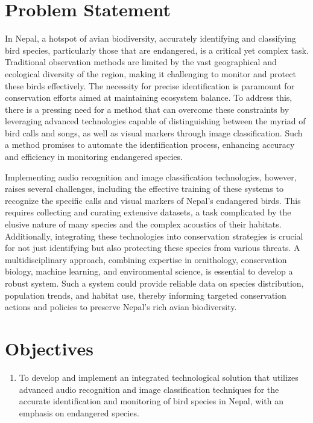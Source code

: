 \section{Problem Statement}
In Nepal, a hotspot of avian biodiversity, accurately identifying and classifying bird species, particularly those that are endangered, is a critical yet complex task. Traditional observation methods are limited by the vast geographical and ecological diversity of the region, making it challenging to monitor and protect these birds effectively. The necessity for precise identification is paramount for conservation efforts aimed at maintaining ecosystem balance. To address this, there is a pressing need for a method that can overcome these constraints by leveraging advanced technologies capable of distinguishing between the myriad of bird calls and songs, as well as visual markers through image classification. Such a method promises to automate the identification process, enhancing accuracy and efficiency in monitoring endangered species.

Implementing audio recognition and image classification technologies, however, raises several challenges, including the effective training of these systems to recognize the specific calls and visual markers of Nepal's endangered birds. This requires collecting and curating extensive datasets, a task complicated by the elusive nature of many species and the complex acoustics of their habitats. Additionally, integrating these technologies into conservation strategies is crucial for not just identifying but also protecting these species from various threats. A multidisciplinary approach, combining expertise in ornithology, conservation biology, machine learning, and environmental science, is essential to develop a robust system. Such a system could provide reliable data on species distribution, population trends, and habitat use, thereby informing targeted conservation actions and policies to preserve Nepal's rich avian biodiversity.

\section{Objectives}
\begin{enumerate}[label=\roman*]
    \item To develop and implement an integrated technological solution that utilizes advanced audio recognition and image classification techniques for the accurate identification and monitoring of bird species in Nepal, with an emphasis on endangered species.
\end{enumerate}

